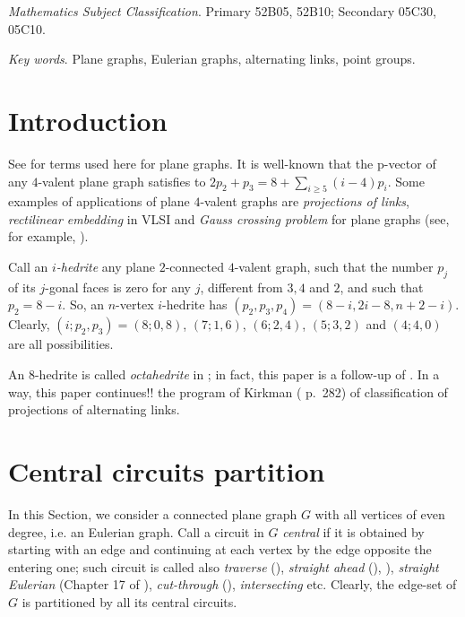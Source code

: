 \documentclass[12pt]{article}
\begin{document}
{\em Mathematics Subject Classification}. Primary 52B05, 52B10;
Secondary 05C30, 05C10.

{\em Key words}. Plane graphs, Eulerian graphs, alternating links, point groups.

\section{Introduction}

See \cite{Gr} for terms used here for plane graphs.
It is well-known that the p-vector of any $4$-valent plane graph satisfies to
$2p_2+p_3=8+ \sum_{i\geq 5} (i-4)p_i$.
Some examples of applications of plane $4$-valent graphs are {\em projections
of links}, {\em rectilinear embedding} in VLSI and {\em Gauss crossing 
problem} for plane graphs (see, for example, \cite{Liu}).

\vspace{2mm}


Call an {\em $i$-hedrite} any plane $2$-connected
$4$-valent graph, such that the number
$p_j$ of its $j$-gonal faces is zero for any $j$, different from 
$3,4$ and $2$, and such that $p_2=8-i$. So, 
an $n$-vertex $i$-hedrite has $(p_2, p_3, p_4)=(8-i, 2i-8, n+2-i)$.
Clearly, $(i;p_2,p_3)=(8;0,8)$, $(7;1,6)$, $(6;2,4)$,
$(5;3,2)$ and $(4;4,0)$ are all possibilities. 

An $8$-hedrite is called {\em octahedrite} in \cite{DSt}; in fact, this paper is a follow-up of \cite{DSt}.
In a way, this paper continues!! the program of Kirkman (\cite{Kirk} p.~282) of classification of projections of alternating links.


















\section{Central circuits partition}

In this Section, we consider a connected plane graph $G$ with all vertices of 
even degree, i.e. an Eulerian graph. 
Call a circuit in $G$ {\it central} if it is obtained by starting with an
edge and continuing at each vertex by the edge opposite the entering one; such 
circuit is called also {\em traverse} 
(\cite{GK}), {\em straight ahead} (\cite{Ha}),  \cite{PTZ}), 
{\em straight Eulerian} (Chapter 17 of \cite{God}), 
{\em cut-through} (\cite{Je}),
{\em intersecting} etc. Clearly, the edge-set of 
$G$ is partitioned by all its central circuits.
\end{document}
